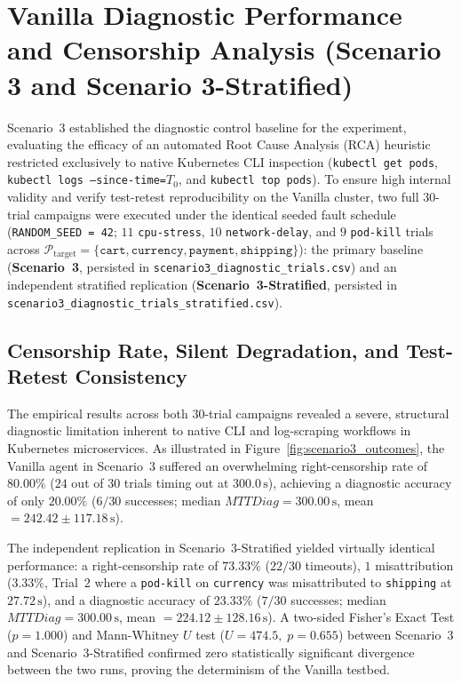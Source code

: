 \section{Vanilla Diagnostic Performance and Censorship Analysis (Scenario 3 and Scenario 3-Stratified)}
\label{sec:scenario3-results}

Scenario~3 established the diagnostic control baseline for the experiment, evaluating the efficacy of an automated Root Cause Analysis (RCA) heuristic restricted exclusively to native Kubernetes CLI inspection (\texttt{kubectl get pods}, \texttt{kubectl logs --since-time=}$T_0$, and \texttt{kubectl top pods}). To ensure high internal validity and verify test-retest reproducibility on the Vanilla cluster, two full 30-trial campaigns were executed under the identical seeded fault schedule (\texttt{RANDOM\_SEED = 42}; $11$ \texttt{cpu-stress}, $10$ \texttt{network-delay}, and $9$ \texttt{pod-kill} trials across $\mathcal{P}_{\text{target}} = \{\texttt{cart}, \texttt{currency}, \texttt{payment}, \texttt{shipping}\}$): the primary baseline (\textbf{Scenario~3}, persisted in \texttt{scenario3\_diagnostic\_trials.csv}) and an independent stratified replication (\textbf{Scenario~3-Stratified}, persisted in \texttt{scenario3\_diagnostic\_trials\_stratified.csv}).

\subsection{Censorship Rate, Silent Degradation, and Test-Retest Consistency}

The empirical results across both 30-trial campaigns revealed a severe, structural diagnostic limitation inherent to native CLI and log-scraping workflows in Kubernetes microservices. As illustrated in Figure~\ref{fig:scenario3_outcomes}, the Vanilla agent in Scenario~3 suffered an overwhelming right-censorship rate of $\mathbf{80.00\%}$ ($24$ out of $30$ trials timing out at $300.0\,\text{s}$), achieving a diagnostic accuracy of only $\mathbf{20.00\%}$ ($6/30$ successes; median $MTTDiag = 300.00\,\text{s}$, mean $= 242.42 \pm 117.18\,\text{s}$).

The independent replication in Scenario~3-Stratified yielded virtually identical performance: a right-censorship rate of $\mathbf{73.33\%}$ ($22/30$ timeouts), $1$ misattribution ($3.33\%$, Trial~2 where a \texttt{pod-kill} on \texttt{currency} was misattributed to \texttt{shipping} at $27.72\,\text{s}$), and a diagnostic accuracy of $\mathbf{23.33\%}$ ($7/30$ successes; median $MTTDiag = 300.00\,\text{s}$, mean $= 224.12 \pm 128.16\,\text{s}$). A two-sided Fisher's Exact Test ($p = 1.000$) and Mann-Whitney $U$ test ($U = 474.5, \; p = 0.655$) between Scenario~3 and Scenario~3-Stratified confirmed zero statistically significant divergence between the two runs, proving the determinism of the Vanilla testbed.


